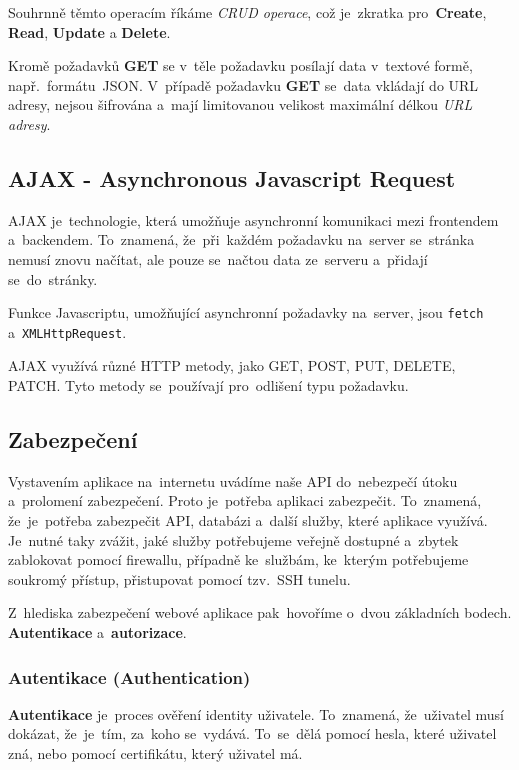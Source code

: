 \documentclass[14pt,a4paper]{article}
\begin{document}
        Souhrnně těmto operacím říkáme \emph{CRUD operace}, což je~zkratka pro~\textbf{Create}, \textbf{Read}, \textbf{Update} a \textbf{Delete}.

        Kromě požadavků \textbf{GET} se v~těle požadavku posílají data v~textové formě, např.~formátu~JSON. 
        V~případě požadavku \textbf{GET} se~data vkládají do URL adresy, nejsou šifrována a~mají limitovanou velikost maximální délkou \emph{URL adresy}.

        \subsection{AJAX - Asynchronous Javascript Request}
        AJAX je~technologie, která umožňuje asynchronní komunikaci mezi frontendem a~backendem.
        To~znamená, že~při~každém požadavku na~server se~stránka nemusí znovu načítat, ale pouze se~načtou data ze~serveru a~přidají se~do~stránky.

        Funkce Javascriptu, umožňující asynchronní požadavky na~server, jsou \texttt{fetch} a~\texttt{XMLHttpRequest}.

        AJAX využívá různé HTTP metody, jako GET, POST, PUT, DELETE, PATCH. Tyto metody se~používají pro~odlišení typu požadavku.

        \subsection{Zabezpečení}
        Vystavením aplikace na~internetu uvádíme naše API do~nebezpečí útoku a~prolomení zabezpečení. Proto je~potřeba aplikaci zabezpečit.
        To~znamená, že~je~potřeba zabezpečit API, databázi a~další služby, které aplikace využívá. Je~nutné taky zvážit,
        jaké služby potřebujeme veřejně dostupné a~zbytek zablokovat pomocí firewallu, případně ke~službám, ke~kterým potřebujeme soukromý přístup,
        přistupovat pomocí tzv.~SSH tunelu.

        Z~hlediska zabezpečení webové aplikace pak~hovoříme o~dvou základních bodech. \textbf{Autentikace} a~\textbf{autorizace}.

            \subsubsection{Autentikace (Authentication)}
            \textbf{Autentikace} je~proces ověření identity uživatele. To~znamená, že~uživatel musí dokázat, že~je~tím, za~koho se~vydává.
            To~se~dělá pomocí hesla, které uživatel zná, nebo pomocí certifikátu, který uživatel má.
\end{document}
